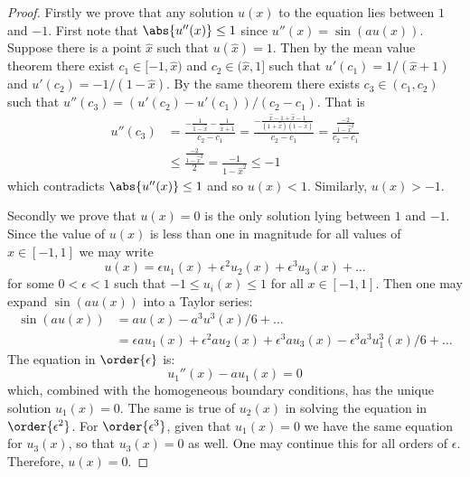 \documentclass{article}
\begin{document}
\begin{proof}
Firstly we prove that any solution $u(x)$ to the equation lies between $1$ and $-1$.
First note that $\abs{u''(x)} \leq 1$ since $u''(x) = \sin(au(x))$.
Suppose there is a point $\hat{x}$ such that $u(\hat{x}) = 1$.
Then by the mean value theorem there exist $c_1 \in [-1,\hat{x})$ and $c_2 \in (\hat{x}, 1]$ such that
$u'(c_1) = 1 / (\hat{x} + 1)$
and
$u'(c_2) = -1 / (1 - \hat{x})$.
By the same theorem there exists $c_3 \in (c_1,c_2)$ such that
$u''(c_3) = (u'(c_2) - u'(c_1)) / (c_2 - c_1)$.
That is
\begin{align*}
u''(c_3) & = \frac{ -\frac{1}{1 - \hat{x}} - \frac{1}{\hat{x}+1} }{c_2 - c_1}
		  = \frac{ -\frac{ \hat{x} - 1 + \hat{x} - 1}{(1+\hat{x})(1-\hat{x})} }{c_2 - c_1}
		  = \frac{ \frac{-2}{1 - \hat{x}^2} }{c_2 - c_1} \\
		 & \leq \frac{ \frac{-2}{1 - \hat{x}^2} }{2} = \frac{-1}{1 - \hat{x}^2} \leq -1
\end{align*}
which contradicts $\abs{u''(x)} \leq 1$ and so $u(x) < 1$.
Similarly, $u(x) > -1$.

Secondly we prove that $u(x) = 0$ is the only solution lying between $1$ and $-1$.
Since the value of $u(x)$ is less than one in magnitude for all values of $x \in [-1,1]$ we may write
\begin{equation*}
u(x) = \epsilon u_1(x) + \epsilon^2 u_2(x) + \epsilon^3 u_3(x) + \dots
\end{equation*}
for some $0 < \epsilon < 1$ such that $-1 \leq u_i(x) \leq 1$ for all $x \in [-1,1]$.
Then one may expand $\sin(au(x))$ into a Taylor series:
\begin{align*}
\sin(au(x)) & = au(x) - a^3 u^3(x) / 6 + \dots \\
			& = \epsilon a u_1(x) + \epsilon^2 a u_2(x) + \epsilon^3 a u_3(x) - \epsilon^3 a^3 u_1^3(x)/6 + \dots
\end{align*}
The equation in $\order{\epsilon}$ is:
\begin{equation*}
u_1''(x) - au_1(x) = 0
\end{equation*}
which, combined with the homogeneous boundary conditions, has the unique solution $u_1(x) = 0$.
The same is true of $u_2(x)$ in solving the equation in $\order{\epsilon^2}$.
For $\order{\epsilon^3}$, given that $u_1(x) = 0$ we have the same equation for $u_3(x)$, so that $u_3(x) = 0$ as well.
One may continue this for all orders of $\epsilon$.
Therefore, $u(x) = 0$.
\end{proof}
\end{document}
